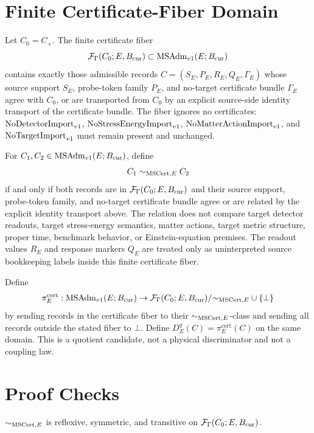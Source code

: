 \section{Finite Certificate-Fiber Domain}

\begin{definition}
Let \(C_0=C_+\).  The finite certificate fiber
\[
  \mathcal F_{\Gamma}(C_0;E,B_{\mathrm{cur}})\subset \mathrm{MSAdm}_{v1}(E;B_{\mathrm{cur}})
\]
contains exactly those admissible records \(C=(S_E,P_E,R_E,Q_E,\Gamma_E)\)
whose source support \(S_E\), probe-token family \(P_E\), and no-target
certificate bundle \(\Gamma_E\) agree with \(C_0\), or are transported from
\(C_0\) by an explicit source-side identity transport of the certificate
bundle.  The fiber ignores no certificates: \(\mathrm{NoDetectorImport}_{v1}\), \(\mathrm{NoStressEnergyImport}_{v1}\),
\(\mathrm{NoMatterActionImport}_{v1}\), and \(\mathrm{NoTargetImport}_{v1}\) must remain present and unchanged.
\end{definition}

\begin{definition}
For \(C_1,C_2\in\mathrm{MSAdm}_{v1}(E;B_{\mathrm{cur}})\), define
\[
  C_1 \mathrel{\sim_{\mathrm{MSCert},E}} C_2
\]
if and only if both records are in \(\mathcal F_{\Gamma}(C_0;E,B_{\mathrm{cur}})\) and
their source support, probe-token family, and no-target certificate bundle
agree or are related by the explicit identity transport above.  The relation
does not compare target detector readouts, target stress-energy semantics,
matter actions, target metric structure, proper time, benchmark behavior, or
Einstein-equation premises.  The readout values \(R_E\) and response markers
\(Q_E\) are treated only as uninterpreted source bookkeeping labels inside
this finite certificate fiber.
\end{definition}

\begin{definition}
Define
\[
  \pi^{\mathrm{cert}}_E:\mathrm{MSAdm}_{v1}(E;B_{\mathrm{cur}})\to
  \mathcal F_{\Gamma}(C_0;E,B_{\mathrm{cur}})/{\sim_{\mathrm{MSCert},E}}\cup\{\bot\}
\]
by sending records in the certificate fiber to their \(\sim_{\mathrm{MSCert},E}\)-class and
sending all records outside the stated fiber to \(\bot\).  Define
\(D^q_E(C)=\pi^{\mathrm{cert}}_E(C)\) on the same domain.  This is a quotient
candidate, not a physical discriminator and not a coupling law.
\end{definition}

\section{Proof Checks}

\begin{proposition}
\(\sim_{\mathrm{MSCert},E}\) is reflexive, symmetric, and transitive on
\(\mathcal F_{\Gamma}(C_0;E,B_{\mathrm{cur}})\).
\end{proposition}

